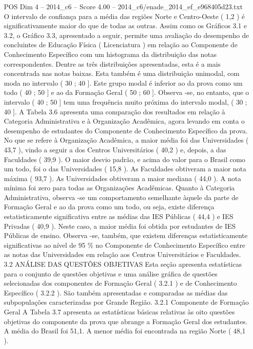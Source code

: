 \begin{textsample}{POS Dim 4 – 2014\_c6 – Score 4.00 – 2014\_c6/enade\_2014\_ef\_e968405d23.txt}
O intervalo de confiança para a média das regiões Norte e Centro-Oeste ( 1,2 ) é significativamente maior do que de todas as outras.
Assim como os Gráficos 3.1 e 3.2, o Gráfico 3.3, apresentado a seguir, permite uma avaliação do desempenho de concluintes de Educação Física ( Licenciatura ) em relação ao Componente de Conhecimento Específico com um histograma da distribuição das notas correspondentes.
Dentre as três distribuições apresentadas, esta é a mais concentrada nas notas baixas.
Esta também é uma distribuição unimodal, com moda no intervalo ( 30 ; 40 ].
Este grupo modal é inferior ao da prova como um todo ( 40 ; 50 ] e ao da Formação Geral ( 50 ; 60 ].
Observa -se, no entanto, que o intervalo ( 40 ; 50 ] tem uma frequência muito próxima do intervalo modal, ( 30 ; 40 ].
A Tabela 3.6 apresenta uma comparação dos resultados em relação à Categoria Administrativa e à Organização Acadêmica, agora levando em conta o desempenho de estudantes do Componente de Conhecimento Específico da prova.
No que se refere à Organização Acadêmica, a maior média foi das Universidades ( 43,7 ), vindo a seguir a dos Centros Universitários ( 40,2 ) e, depois, a das Faculdades ( 39,9 ).
O maior desvio padrão, e acima do valor para o Brasil como um todo, foi o das Universidades ( 15,8 ).
As Faculdades obtiveram a maior nota máxima ( 93,7 ).
As Universidades obtiveram a maior mediana ( 44,0 ).
A nota mínima foi zero para todas as Organizações Acadêmicas.
Quanto à Categoria Administrativa, observa -se um comportamento semelhante àquele da parte de Formação Geral e ao da prova como um todo, ou seja, existe diferença estatisticamente significativa entre as médias das IES Públicas ( 44,4 ) e IES Privadas ( 40,9 ).
Neste caso, a maior média foi obtida por estudantes de IES Públicas de ensino.
Observa -se, também, que existem diferenças estatisticamente significativas ao nível de 95 \% no Componente de Conhecimento Específico entre as notas das Universidades em relação aos Centros Universitários e Faculdades. 3.2 ANÁLISE DAS QUESTÕES OBJETIVAS Esta seção apresenta estatísticas para o conjunto de questões objetivas e uma análise gráfica de questões selecionadas dos componentes de Formação Geral ( 3.2.1 ) e de Conhecimento Específico ( 3.2.2 ).
São também apresentadas e comparadas as médias das subpopulações caracterizadas por Grande Região. 3.2.1 Componente de Formação Geral A Tabela 3.7 apresenta as estatísticas básicas relativas às oito questões objetivas do componente da prova que abrange a Formação Geral dos estudantes.
A média do Brasil foi 51,1.
A menor média foi encontrada na região Norte ( 48,1 ).

\end{textsample}
